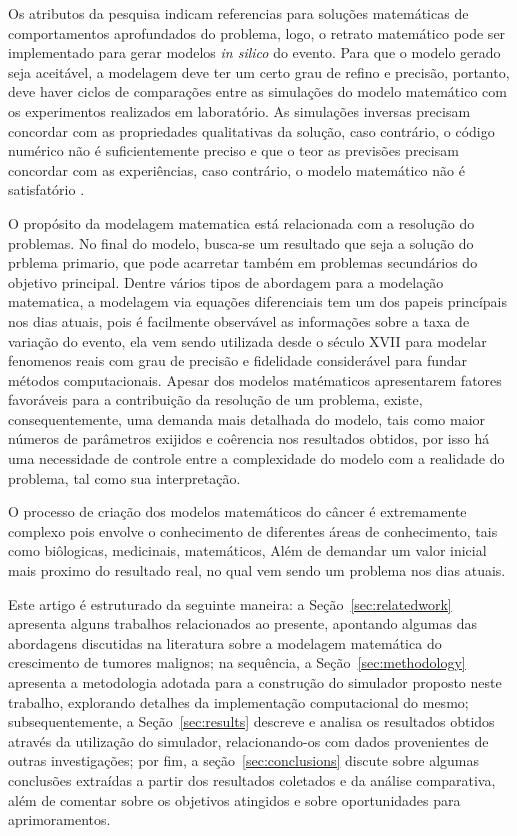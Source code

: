\documentclass[12pt]{article}
\begin{document}
Os atributos da pesquisa indicam referencias para soluções matemáticas de comportamentos aprofundados do problema, logo, o retrato matemático pode ser implementado para gerar modelos \textit{in silico} do evento. Para que o modelo gerado seja aceitável, a modelagem deve ter um certo grau de refino e precisão, portanto, deve haver ciclos de comparações entre as simulações do modelo matemático com os experimentos realizados em laboratório. As simulações inversas precisam concordar com as propriedades qualitativas da solução, caso contrário, o código numérico não é suficientemente preciso e que o teor as previsões precisam concordar com as experiências, caso contrário, o modelo matemático não é satisfatório \cite{Preziosi2003}. %

O propósito da modelagem matematica está relacionada com a resolução do problemas. No final do modelo, busca-se um resultado que seja a solução do prblema primario, que pode acarretar também em problemas secundários do objetivo principal. Dentre vários tipos de abordagem para a modelação matematica, a modelagem via equações diferenciais tem um dos papeis princípais nos dias atuais, pois é facilmente observável as informações sobre a taxa de variação do evento, ela vem sendo utilizada desde o século XVII para modelar fenomenos reais com grau de precisão e fidelidade considerável para fundar métodos computacionais.
Apesar dos modelos matématicos apresentarem fatores favoráveis para a contribuição da resolução de um problema, existe, consequentemente, uma demanda mais detalhada do modelo, tais como maior números de parâmetros exijidos e coêrencia nos resultados obtidos, por isso há uma necessidade de controle entre a complexidade do modelo com a realidade do problema, tal como sua interpretação.

O processo de criação dos modelos matemáticos do câncer é extremamente complexo pois envolve o conhecimento de diferentes áreas de conhecimento, tais como biôlogicas, medicinais, matemáticos, Além de demandar um valor inicial mais proximo do resultado real, no qual vem sendo um problema nos dias atuais.

Este artigo é estruturado da seguinte maneira: a Seção~\ref{sec:relatedwork} apresenta alguns trabalhos relacionados ao presente, apontando algumas das abordagens discutidas na literatura sobre a modelagem matemática do crescimento de tumores malignos; na sequência, a Seção~\ref{sec:methodology} apresenta a metodologia adotada para a construção do simulador proposto neste trabalho, explorando detalhes da implementação computacional do mesmo; subsequentemente, a Seção~\ref{sec:results} descreve e analisa os resultados obtidos através da utilização do simulador, relacionando-os com dados provenientes de outras investigações; por fim, a seção~\ref{sec:conclusions} discute sobre algumas conclusões extraídas a partir dos resultados coletados e da análise comparativa, além de comentar sobre os objetivos atingidos e sobre oportunidades para aprimoramentos.
\end{document}

